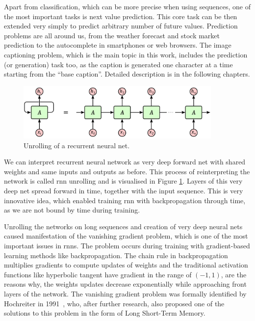 Apart from classification, which can be more precise when using sequences, one of the most important tasks is next value prediction. This core task can be then extended very simply to predict arbitrary number of future values. Prediction problems are all around us, from the weather forecast and stock market prediction to the autocomplete in smartphones or web browsers. The image captioning problem, which is the main topic in this work, includes the prediction (or generation) task too, as the caption is generated one character at a time starting from the \textquotedblleft base caption\textquotedblright. Detailed description is in the following chapters.

\begin{figure}[!t]
	\centering
	\includegraphics[width=0.9\textwidth]{fig/rnn-unrolled.pdf}
	\caption{Unrolling of a recurrent neural net.
		\label{fig:rnn-unroll}}
\end{figure}

We can interpret recurrent neural network as very deep forward net with shared weights and same inputs and outputs as before. This process of reinterpreting the network is called \gls{rnn} unrolling and is visualised in Figure \ref{fig:rnn-unroll}. Layers of this very deep net spread forward in time, together with the input sequence. This is very innovative idea, which enabled training \gls{rnn} with backpropagation through time, as we are not bound by time during training.

Unrolling the networks on long sequences and creation of very deep neural nets caused manifestation of the vanishing gradient problem, which is one of the most important issues in \gls{rnn}s. The problem occurs during training with gradient-based learning methods like backpropagation. The chain rule in backpropagation multiplies gradients  to compute updates of weights and the traditional activation functions like hyperbolic tangent have gradient in the range of $ (-1, 1) $, are the reasons why, the weights updates decrease exponentially while approaching front layers of the network. The vanishing gradient problem was formally identified by Hochreiter in 1991~\cite{hochreiter1991untersuchungen}, who, after further research, also proposed one of the solutions to this problem in the form of Long Short-Term Memory.

